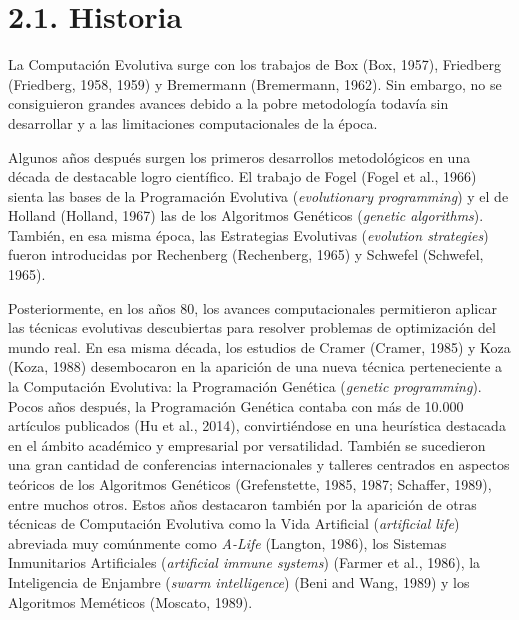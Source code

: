 \documentclass[spanish,a4paper,12pt,twoside]{report}
\begin{document}
  \section*{\Large 2.1. Historia}
  La Computación Evolutiva surge con los trabajos de Box (Box, 1957),  Friedberg (Friedberg, 1958, 1959) y Bremermann (Bremermann, 1962). Sin embargo, no se consiguieron grandes avances debido a la pobre metodología todavía sin desarrollar y a las limitaciones computacionales de la época. \par
  Algunos años después surgen los primeros desarrollos metodológicos en una década de destacable logro científico. El trabajo de Fogel (Fogel et al., 1966) sienta las bases de la Programación Evolutiva (\emph{evolutionary programming}) y el de Holland (Holland, 1967) las de los Algoritmos Genéticos (\emph{genetic algorithms}). También, en esa misma época, las Estrategias Evolutivas (\emph{evolution strategies}) fueron introducidas por Rechenberg (Rechenberg, 1965) y Schwefel (Schwefel, 1965). \par
  Posteriormente, en los años 80, los avances computacionales permitieron aplicar las técnicas evolutivas descubiertas para resolver problemas de optimización del mundo real. En esa misma década, los estudios de Cramer (Cramer, 1985) y Koza (Koza, 1988) desembocaron en la aparición de una nueva técnica perteneciente a la Computación Evolutiva: la Programación Genética (\emph{genetic programming}). Pocos años después, la Programación Genética contaba con más de 10.000 artículos publicados (Hu et al., 2014), convirtiéndose en una heurística destacada en el ámbito académico y empresarial por versatilidad. También se sucedieron una gran cantidad de conferencias internacionales y talleres centrados en aspectos teóricos de los Algoritmos Genéticos (Grefenstette, 1985, 1987; Schaffer, 1989), entre muchos otros. Estos años destacaron también por la aparición de otras técnicas de Computación Evolutiva como la Vida Artificial (\emph{artificial life}) abreviada muy comúnmente como \emph{A-Life} (Langton, 1986), los Sistemas Inmunitarios Artificiales (\emph{artificial immune systems}) (Farmer et al., 1986), la Inteligencia de Enjambre (\emph{swarm intelligence}) (Beni and Wang, 1989) y los Algoritmos Meméticos (Moscato, 1989). \par
\end{document}
